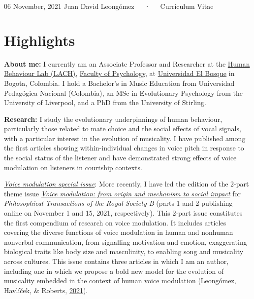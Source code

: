 \documentclass[11pt, a4paper]{awesome-cv}
\begin{document}
\makecvheader

\makecvfooter
  {06 November, 2021}
    {Juan David Leongómez~~~·~~~Curriculum Vitae}
  {\thepage}





\hypertarget{highlights}{%
\section{Highlights}\label{highlights}}

\textbf{About me:} I currently am an Associate Professor and Researcher
at the \href{https://www.psicologia.unbosque.edu.co/lach}{Human
Behaviour Lab (LACH)},
\href{https://www.uelbosque.edu.co/psicologia}{Faculty of Psychology},
at \href{https://www.uelbosque.edu.co/}{Universidad El Bosque} in
Bogota, Colombia. I hold a Bachelor's in Music Education from
Universidad Pedagógica Nacional (Colombia), an MSc in Evolutionary
Psychology from the University of Liverpool, and a PhD from the
University of Stirling.

\textbf{Research:} I study the evolutionary underpinnings of human
behaviour, particularly those related to mate choice and the social
effects of vocal signals, with a particular interest in the evolution of
musicality. I have published among the first articles showing
within-individual changes in voice pitch in response to the social
status of the listener and have demonstrated strong effects of voice
modulation on listeners in courtship contexts.

\underline{\textit{Voice modulation special issue}}: More recently, I
have led the edition of the 2-part theme issue
\href{https://royalsocietypublishing.org/toc/rst\%20b/376/1840}{\textit{Voice modulation: from origin and mechanism to social impact}}
for \emph{Philosophical Transactions of the Royal Society B} (parts 1
and 2 publishing online on November 1 and 15, 2021, respectively). This
2-part issue constitutes the first compendium of research on voice
modulation. It includes articles covering the diverse functions of voice
modulation in human and nonhuman nonverbal communication, from
signalling motivation and emotion, exaggerating biological traits like
body size and masculinity, to enabling song and musicality across
cultures. This issue contains three articles in which I am an author,
including one in which we propose a bold new model for the evolution of
musicality embedded in the context of human voice modulation (Leongómez,
Havlíček, \& Roberts,
\href{https://jdleongomez.info/en/publication/leongomez2021musicality/}{2021}).
\end{document}
